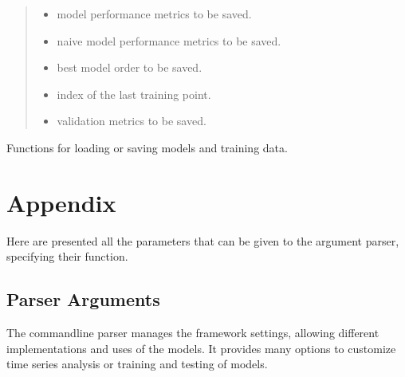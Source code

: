 \documentclass[letterpaper,10pt,english]{sphinxmanual}
\begin{document}
\begin{fulllineitems}
\begin{quote}
\begin{description}
\begin{itemize}
\item {} 
\sphinxAtStartPar
{} \textendash{} model performance metrics to be saved.

\item {} 
\sphinxAtStartPar
{} \textendash{} naive model performance metrics to be saved.

\item {} 
\sphinxAtStartPar
{} \textendash{} best model order to be saved.

\item {} 
\sphinxAtStartPar
{} \textendash{} index of the last training point.

\item {} 
\sphinxAtStartPar
{} \textendash{} validation metrics to be saved.

\end{itemize}

\end{description}\end{quote}

\end{fulllineitems}


\sphinxAtStartPar
Functions for loading or saving models and training data.


\chapter{Appendix}
\label{\detokenize{index:appendix}}
\sphinxAtStartPar
Here are presented all the parameters that can be given to the argument parser, specifying their function.

\sphinxstepscope


\section{Parser Arguments}
\label{\detokenize{docs/parser_arguments:parser-arguments}}\label{\detokenize{docs/parser_arguments::doc}}
\sphinxAtStartPar
The command\sphinxhyphen{}line parser manages the framework settings, allowing different implementations and uses of the models.
It provides many options to customize time series analysis or training and testing of models.
\end{document}
